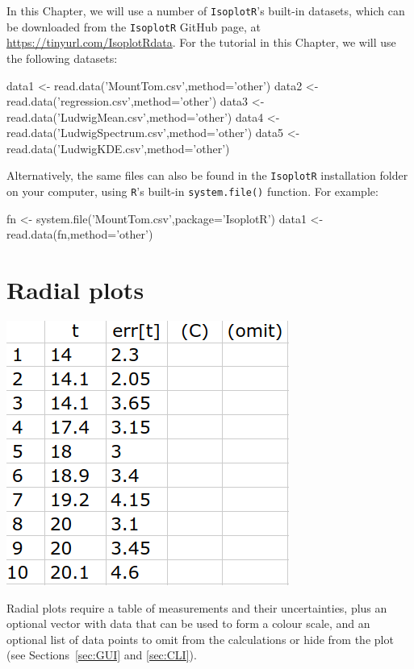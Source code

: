 \begin{refsection}
In this Chapter, we will use a number of \texttt{IsoplotR}'s built-in
datasets, which can be downloaded from the \texttt{IsoplotR} GitHub
page, at \url{https://tinyurl.com/IsoplotRdata}. For the tutorial in
this Chapter, we will use the following datasets:

\begin{script}
data1 <- read.data('MountTom.csv',method='other')
data2 <- read.data('regression.csv',method='other')
data3 <- read.data('LudwigMean.csv',method='other')
data4 <- read.data('LudwigSpectrum.csv',method='other')
data5 <- read.data('LudwigKDE.csv',method='other')
\end{script}

Alternatively, the same files can also be found in the
\texttt{IsoplotR} installation folder on your computer, using
\texttt{R}'s built-in \texttt{system.file()} function. For example:

\begin{script}
fn <- system.file('MountTom.csv',package='IsoplotR')
data1 <- read.data(fn,method='other')
\end{script}

\section{Radial plots}\label{sec:OtherRadial}

\noindent\begin{minipage}[t]{.27\linewidth}
  \strut\vspace*{-\baselineskip}\newline
  \includegraphics[width=\linewidth]{../figures/OtherRadialInput.png}
\end{minipage}
\begin{minipage}[t]{.73\linewidth}
  Radial plots require a table of measurements and their
  uncertainties, plus an optional vector with data that can be used to
  form a colour scale, and an optional list of data points to omit
  from the calculations or hide from the plot (see
  Sections~\ref{sec:GUI} and \ref{sec:CLI}).
\end{minipage}


\end{refsection}
